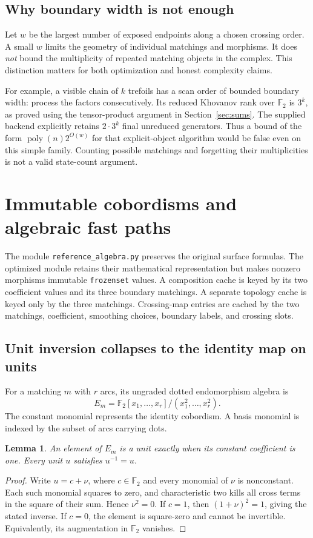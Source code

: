 \documentclass[11pt]{article}
\newtheorem{lemma}[theorem]{Lemma}
\theoremstyle{remark}\newtheorem{remark}[theorem]{Remark}
\newcommand{\F}{\mathbb F}
\newcommand{\poly}{\operatorname{poly}}
\begin{document}
\subsection{Why boundary width is not enough}
Let $w$ be the largest number of exposed endpoints along a chosen crossing
order. A small $w$ limits the geometry of individual matchings and morphisms.
It does \emph{not} bound the multiplicity of repeated matching objects in the
complex. This distinction matters for both optimization and honest complexity
claims.

For example, a visible chain of $k$ trefoils has a scan order of bounded
boundary width: process the factors consecutively. Its reduced Khovanov rank
over $\F_2$ is $3^k$, as proved using the tensor-product argument in
Section~\ref{sec:sums}. The supplied backend explicitly retains $2\cdot3^k$
final unreduced generators. Thus a bound of the form
$\poly(n)2^{O(w)}$ for that explicit-object algorithm would be false even on
this simple family. Counting possible matchings and forgetting their
multiplicities is not a valid state-count argument.

\section{Immutable cobordisms and algebraic fast paths}\label{sec:algebra}
The module \texttt{reference\_algebra.py} preserves the original surface
formulas. The optimized module retains their mathematical representation
but makes nonzero morphisms immutable \texttt{frozenset} values. A composition
cache is keyed by its two coefficient values and its three boundary
matchings. A separate topology cache is keyed only by the three matchings.
Crossing-map entries are cached by the two matchings, coefficient, smoothing
choices, boundary labels, and crossing slots.

\subsection{Unit inversion collapses to the identity map on units}
For a matching $m$ with $r$ arcs, its ungraded dotted endomorphism algebra is
\begin{equation}\label{eq:ring}
 E_m=\F_2[x_1,\ldots,x_r]/(x_1^2,\ldots,x_r^2).
\end{equation}
The constant monomial represents the identity cobordism. A basis monomial
is indexed by the subset of arcs carrying dots.

\begin{lemma}\label{lem:unit}
An element of $E_m$ is a unit exactly when its constant coefficient is one.
Every unit $u$ satisfies $u^{-1}=u$.
\end{lemma}
\begin{proof}
Write $u=c+\nu$, where $c\in\F_2$ and every monomial of $\nu$ is nonconstant.
Each such monomial squares to zero, and characteristic two kills all cross
terms in the square of their sum. Hence $\nu^2=0$. If $c=1$, then
$(1+\nu)^2=1$, giving the stated inverse. If $c=0$, the element is
square-zero and cannot be invertible. Equivalently, its augmentation in
$\F_2$ vanishes.
\end{proof}
\end{document}
